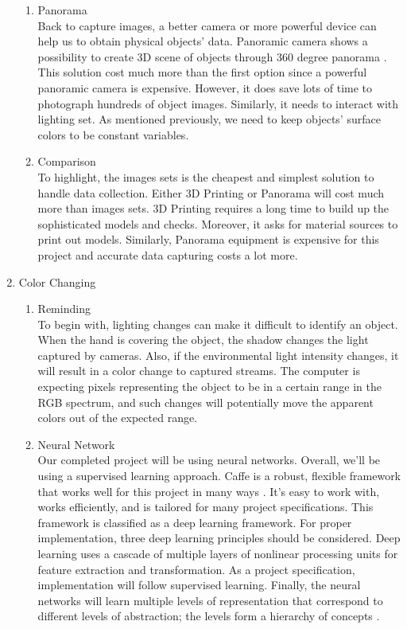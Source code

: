 \documentclass[10pt,journal,compsoc, draftclsnofoot,onecolumn]{IEEEtran}
\begin{document}
\begin{enumerate}
\begin{enumerate}
    \item Panorama \\
    Back to capture images, a better camera or more powerful device can help us to obtain physical objects' data. Panoramic camera shows a possibility to create 3D scene of objects through 360 degree panorama \cite{102:online}. This solution cost much more than the first option since a powerful panoramic camera is expensive. However, it does save lots of time to photograph hundreds of object images. Similarly, it needs to interact with lighting set. As mentioned previously, we need to keep objects' surface colors to be constant variables. 
    \item Comparison \\
    To highlight, the images sets is the cheapest and simplest solution to handle data collection. Either 3D Printing or Panorama will cost much more than images sets. 3D Printing requires a long time to build up the sophisticated models and checks. Moreover, it asks for material sources to print out models. Similarly, Panorama equipment is expensive for this project and accurate data capturing costs a lot more. 
    \end{enumerate}
\item Color Changing
    \begin{enumerate}
    \item Reminding \\
    To begin with, lighting changes can make it difficult to identify an object. When the hand is covering the object, the shadow changes the light captured by cameras. Also, if the environmental light intensity changes, it will result in a color change to captured streams. The computer is expecting pixels representing the object to be in a certain range in the RGB spectrum, and such changes will potentially move the apparent colors out of the expected range. 
    \item Neural Network \\
    Our completed project will be using neural networks. Overall, we'll be using a supervised learning approach. Caffe is a robust, flexible framework that works well for this project in many ways \cite{103:online}. It's easy to work with, works efficiently, and is tailored for many project specifications. This framework is classified as a deep learning framework. For proper implementation, three deep learning principles should be considered. Deep learning uses a cascade of multiple layers of nonlinear processing units for feature extraction and transformation. As a project specification, implementation will follow supervised learning. Finally, the neural networks will learn multiple levels of representation that correspond to different levels of abstraction; the levels form a hierarchy of concepts \cite{deep_learning}.

\end{enumerate}
\end{enumerate}
\end{document}
